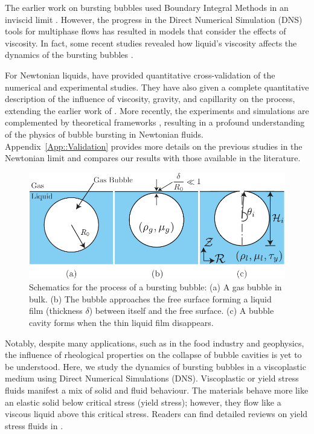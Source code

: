 \documentclass[final]{jfm}
\begin{document}
The earlier work on bursting bubbles used Boundary Integral Methods in an inviscid limit \citep{boulton1993gas,longuet1995critical}. However, the progress in the Direct Numerical Simulation (DNS) tools for multiphase flows \citep{tryggvason2011direct, popinet2003gerris, popinet2009accurate} has resulted in models that consider the effects of viscosity. In fact, some recent studies revealed how liquid's viscosity affects the dynamics of the bursting bubbles \citep{deike2018dynamics, gordillo2019capillary}.

For Newtonian liquids, \cite{deike2018dynamics} have provided quantitative cross-validation of the numerical and experimental studies. They have also given a complete quantitative description of the influence of viscosity, gravity, and capillarity on the process, extending the earlier work of \cite{duchemin2002jet}. More recently, the experiments and simulations are complemented by theoretical frameworks  \citep{gordillo2019capillary, ganan2017revision}, resulting in a profound understanding of the physics of bubble bursting in Newtonian fluids. Appendix~\ref{App::Validation} provides more details on the previous studies in the Newtonian limit and compares our results with those available in the literature.

 \begin{figure}
	\centerline{\includegraphics[width=0.67\linewidth]{Figures/Figure1_Schematic-eps-converted-to.pdf}}%
	\caption{Schematics for the process of a bursting bubble: (a) A gas bubble in bulk. (b) The bubble approaches the free surface forming a liquid film (thickness $\delta$) between itself and the free surface. (c) A bubble cavity forms when the thin liquid film disappears.}
	\label{fig:Schematic}
\end{figure}

Notably, despite many applications, such as in the food industry and geophysics, the influence of rheological properties on the collapse of bubble cavities is yet to be understood. Here, we study the dynamics of bursting bubbles in a viscoplastic medium using Direct Numerical Simulations (DNS). Viscoplastic or yield stress fluids manifest a mix of solid and fluid behaviour. The materials behave more like an elastic solid below critical stress (yield stress); however, they flow like a viscous liquid above this critical stress. Readers can find detailed reviews on yield stress fluids in \cite{bird1983rheology,coussot2014yield,balmforth2014yielding,bonn2017yield}.
\end{document}
